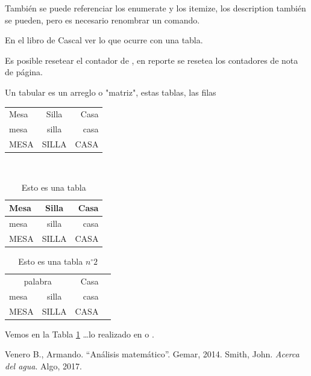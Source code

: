 \documentclass{article}
\begin{document}
También se puede referenciar los enumerate y los itemize, los description también se pueden, pero es necesario renombrar un comando.


En el libro de Cascal ver lo que ocurre con una tabla.

Es posible resetear el contador de , en reporte se resetea los contadores de nota de página.

Un tabular es un arreglo o "matriz", estas tablas, las filas\\[2cm]

\renewcommand{\spanishtablename}{Tablita}

\begin{tabular}{lcr}
	Mesa & Silla & Casa \\
	mesa & silla & casa \\
	MESA & SILLA & CASA
\end{tabular}

\ \\[2cm]
\begin{table}[H] %
\centering
\caption{Esto es una tabla}%
\begin{tabular}{|l|c|r|}
	\hline
	Mesa & Silla & Casa \\
	\hline
	mesa & silla & casa \\
	\hline
	MESA & SILLA & CASA \\
	\hline
\end{tabular}
\end{table}

\begin{table}[H] %
	\centering
	\caption{Esto es una tabla $n^{\circ}2$}\label{tab:2}%
	\begin{tabular}{|l|c|r|p{3cm}||}
		\hline
		\multicolumn{2}{|c|}{palabra} & Casa \\
		\cline{2-3}
		mesa & silla & casa \\
		\hline\hline
		MESA & SILLA & CASA\newline \\
		\hline
	\end{tabular}
\end{table}
Vemos en la Tabla \ref{tab:2} \ldots lo realizado en \cite{V14} o \cite{smi17}.
\begin{thebibliography}{99}
	 Venero B., Armando. ``Análisis matemático''. Gemar, 2014.
	 Smith, John. \emph{Acerca del agua}. Algo, 2017.
\end{thebibliography}
\newpage
\end{document}
